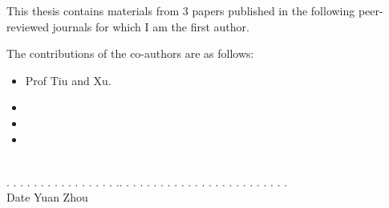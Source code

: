\noindent This thesis contains materials from 3 papers published in the following peer-reviewed journals for which I am the first author.


\noindent The contributions of the co-authors are as follows:
\begin{itemize}
  \item Prof Tiu and Xu.
  \item 
  \item 
  \item 
\end{itemize}

\vspace{150pt}


 \ \   \qquad \qquad \qquad \qquad\qquad\qquad\qquad\qquad\quad \\
. . . . . . . . . . . . . . . . .\qquad \qquad \qquad \qquad\qquad \qquad . . . .  . . . . . . . . . . . . . . . . . . . . .\\
\indent \qquad Date \qquad \qquad \qquad  \qquad \qquad \qquad\qquad\qquad\qquad\qquad Yuan Zhou
